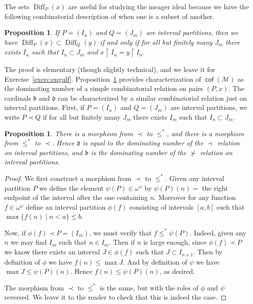 \documentclass[11pt,oneside]{amsbook}
\newcommand{\Meager}{\mathcal M}
\DeclareMathOperator{\cof}{\mathsf{cof}}
\DeclareMathOperator{\Diff}{Diff}
\theoremstyle{definition}
\theoremstyle{plain}
\newtheorem{proposition}[theorem]{Proposition}
\theoremstyle{definition}
\theoremstyle{remark}
\numberwithin{equation}{section}
\numberwithin{figure}{section}
\begin{document}
The sets $\Diff_P(x)$ are useful for studying the meager ideal because we have the following combinatorial description of when one is a subset of another.

\begin{proposition}
  \label{prop:engulf}
  If $P=(I_n)$ and $Q=(J_m)$ are interval partitions, then we have $\Diff_P(x)\subset\Diff_Q(y)$ if and only if for all but finitely many $J_m$ there exists $I_n$ such that $I_n\subset J_m$ and $x\restriction I_n=y\restriction I_n$.
\end{proposition}

The proof is elementary (though slightly technical), and we leave it for Exercise~\ref{exerc:engulf}. Proposition~\ref{prop:engulf} provides characterization of $\cof(\Meager)$ as the dominating number of a simple combinatorial relation on pairs $(P,x)$. The cardinals $\mathfrak b$ and $\mathfrak d$ can be characterized by a similar combinatorial relation just on interval partitions. First, if $P=(I_n)$ and $Q=(J_m)$ are interval partitions, we write $P\prec Q$ if for all but finitely many $J_m$ there exists $I_m$ such that $I_n\subset J_m$. 

\begin{proposition}
  There is a morphism from $\prec$ to $\leq^*$, and there is a morphism from $\leq^*$ to $\prec$. Hence $\mathfrak d$ is equal to the dominating number of the $\prec$ relation on interval partitions, and $\mathfrak b$ is the dominating number of the $\not\succ$ relation on interval partitions.
\end{proposition}

\begin{proof}
  We first construct a morphism from $\prec$ to $\leq^*$. Given any interval partition $P$ we define the element $\psi(P)\in\omega^\omega$ by $\psi(P)(n)=$ the right endpoint of the interval after the one containing $n$. Moreover for any function $f\in\omega^\omega$ define an interval partition $\phi(f)$ consisting of intervals $[a,b]$ such that $\max\{f(n)\mid n<a\}\leq b$.

  Now, if $\phi(f)\prec P=(I_m)$, we must verify that $f\leq^*\psi(P)$. Indeed, given any $n$ we may find $I_m$ such that $n\in I_m$. Then if $n$ is large enough, since $\phi(f)\prec P$ we know there exists an interval $J\in\phi(f)$ such that $J\subset I_{n+1}$. Then by definition of $\phi$ we have $f(n)\leq\max J$. And by definition of $\psi$ we have $\max J\leq\psi(P)(n)$. Hence $f(n)\leq\psi(P)(n)$, as desired.

  The morphism from $\prec$ to $\leq^*$ is the same, but with the roles of $\phi$ and $\psi$ reversed. We leave it to the reader to check that this is indeed the case.
\end{proof}
\end{document}
